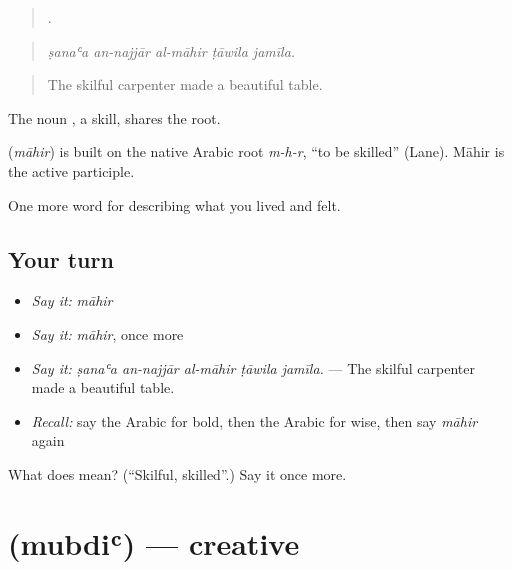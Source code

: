 \begin{quote}
    .
\end{quote}

\begin{quote}
\emph{ṣanaʿa an-najjār al-māhir ṭāwila jamīla.}
\end{quote}

\begin{quote}
The skilful carpenter made a beautiful table.
\end{quote}

The noun , a skill, shares the root.

\begin{cousinweb}
\textbf{} (\emph{māhir}) is built on the native Arabic root \emph{m-h-r}, \textquotedblleft{}to be skilled\textquotedblright{} (Lane). Māhir is the active participle.
\end{cousinweb}

\begin{grammarlens}[title={What you've built}]
One more word for describing what you lived and felt.
\end{grammarlens}

\subsection*{Your turn}
\begin{itemize}
\raggedright
  \item \emph{Say it:} \emph{māhir}
  \item \emph{Say it:} \emph{māhir}, once more
  \item \emph{Say it:} \emph{ṣanaʿa an-najjār al-māhir ṭāwila jamīla.} — The skilful carpenter made a beautiful table.
  \item \emph{Recall:} say the Arabic for bold, then the Arabic for wise, then say \emph{māhir} again
\end{itemize}

\begin{tcolorbox}[breakable,colback=teal!4,colframe=teal!35!black,title={Before you move on}]
What does  mean? (\textquotedblleft{}Skilful, skilled\textquotedblright{}.) Say it once more.
\end{tcolorbox}
\section[\texorpdfstring{\ar{مبدع} (mubdiʿ)}{مبدع (mubdiʿ)}]{ (mubdiʿ) — creative}

